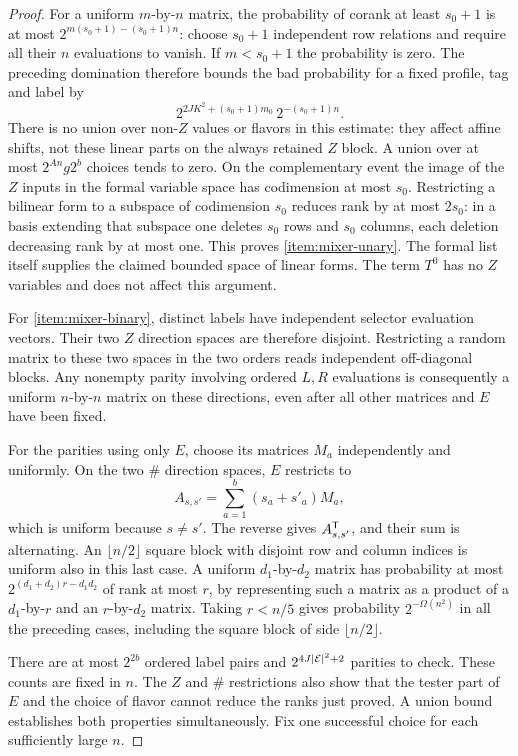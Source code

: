 \begin{proof}
For a uniform $m$-by-$n$ matrix, the probability of corank at
least $s_0+1$ is at most
$2^{m(s_0+1)-(s_0+1)n}$: choose $s_0+1$ independent row
relations and require all their $n$ evaluations to vanish.
If $m<s_0+1$ the probability is zero.  The preceding domination
therefore bounds the bad probability for a fixed profile, tag
and label by
\[
 2^{2JK^2+(s_0+1)m_0}\,2^{-(s_0+1)n}.
\]
There is no union over non-$Z$ values or flavors in this estimate:
they affect affine shifts, not these linear parts on the always
retained $Z$ block.  A union over at most $2^{An}g2^b$ choices
tends to zero.  On the complementary event the image of the
$Z$ inputs in the formal variable space has codimension at most
$s_0$.  Restricting a bilinear form to a subspace of codimension
$s_0$ reduces rank by at most $2s_0$: in a basis extending
that subspace one deletes $s_0$ rows and $s_0$ columns, each
deletion decreasing rank by at most one.  This proves
\ref{item:mixer-unary}.  The formal list itself supplies the
claimed bounded space of linear forms.  The term $T^0$ has no
$Z$ variables and does not affect this argument.

For \ref{item:mixer-binary}, distinct labels have independent
selector evaluation vectors.  Their two $Z$ direction spaces
are therefore disjoint.  Restricting a random matrix to these
two spaces in the two orders reads independent off-diagonal
blocks.  Any nonempty parity involving ordered $L,R$ evaluations
is consequently a uniform $n$-by-$n$ matrix on these directions,
even after all other matrices and $E$ have been fixed.

For the parities using only $E$, choose its matrices $M_a$
independently and uniformly.  On the two $\#$ direction spaces,
$E$ restricts to
\[
 A_{s,s'}=\sum_{a=1}^b(s_a+s'_a)M_a,
\]
which is uniform because $s\ne s'$.  The reverse gives
$A_{s,s'}^{\mathsf T}$, and their sum is alternating.  An
$\lfloor n/2\rfloor$ square block with disjoint row and column
indices is uniform also in this last case.  A uniform
$d_1$-by-$d_2$ matrix has probability at most
$2^{(d_1+d_2)r-d_1d_2}$ of rank at most $r$, by representing
such a matrix as a product of a $d_1$-by-$r$ and an
$r$-by-$d_2$ matrix.  Taking $r< n/5$ gives probability
$2^{-\Omega(n^2)}$ in all the preceding cases, including the
square block of side $\lfloor n/2\rfloor$.

There are at most $2^{2b}$ ordered label pairs and
$2^{4J|\mathcal E|^2+2}$ parities to check.  These counts are fixed
in $n$.  The $Z$ and $\#$ restrictions also show that the
tester part of $E$ and the choice of flavor cannot reduce the
ranks just proved.  A union bound establishes both properties
simultaneously.  Fix one successful choice for each sufficiently
large $n$.
\end{proof}

